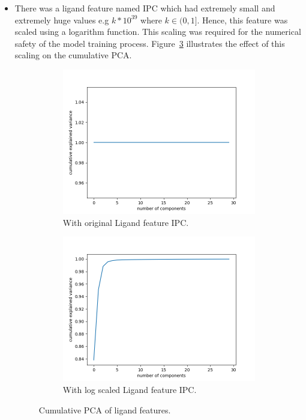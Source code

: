 \documentclass[11pt]{article}
\begin{document}
\begin{itemize}
\item There was a ligand feature named IPC which had extremely small and extremely huge values e.g $k * 10^{39}$ where $k \in (0,1]$.
Hence, this feature was scaled using a logarithm function.
This scaling was required for the numerical safety of the model training process.
Figure~\ref{fig:PCAAnalysis} illustrates the effect of this scaling on the cumulative PCA.

\begin{figure}
     \centering
     \begin{subfigure}[b]{0.45\textwidth}
         \centering
    \includegraphics[scale=0.5]{images/pcaligandanalysisIPC}
    \caption{With original Ligand feature IPC.}
    \label{fig:pcaproteinanalysisIPC}
     \end{subfigure}
     \hfill
     \begin{subfigure}[b]{0.45\textwidth}
         \centering
        \includegraphics[scale=0.5]{images/pcawithscaledIPC}
        \caption{With log scaled Ligand feature IPC.}
        \label{fig:pcawithscaledIPC}
     \end{subfigure}
     \caption{Cumulative PCA of ligand features.}
     \label{fig:PCAAnalysis}
\end{figure}


\end{itemize}
\end{document}
